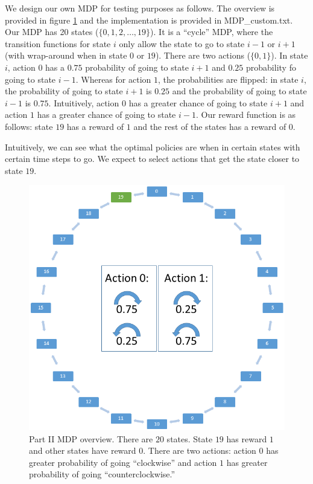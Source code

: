 \documentclass[paper=a4, fontsize=11pt]{scrartcl}
\begin{document}
We design our own MDP for testing purposes as follows. The overview is provided in figure \ref{fig:overview} and the implementation is provided in MDP\_custom.txt. Our MDP has 20 states ($\{ 0, 1, 2, \ldots, 19 \}$). It is a ``cycle'' MDP, where the transition functions for state $i$ only allow the state to go to state $i-1$ or $i+1$ (with wrap-around when in state $0$ or $19$). There are two actions ($\{ 0, 1 \}$). In state $i$, action $0$ has a $0.75$ probability of going to state $i+1$ and $0.25$ probability fo going to state $i-1$. Whereas for action $1$, the probabilities are flipped: in state $i$, the probability of going to state $i+1$ is $0.25$ and the probability of going to state $i-1$ is $0.75$. Intuitively, action $0$ has a greater chance of going to state $i+1$ and action $1$ has a greater chance of going to state $i-1$. Our reward function is as follows: state $19$ has a reward of $1$ and the rest of the states has a reward of $0$.

Intuitively, we can see what the optimal policies are when in certain states with certain time steps to go. We expect to select actions that get the state closer to state $19$.

\begin{figure}
\centering
  	\includegraphics[width=1\linewidth]{assignment2_mdp_figure.png}
\caption{Part II MDP overview. There are $20$ states. State $19$ has reward $1$ and other states have reward $0$. There are two actions: action $0$ has greater probability of going ``clockwise'' and action $1$ has greater probability of going ``counterclockwise.''}
\label{fig:overview}
\end{figure}
\end{document}
